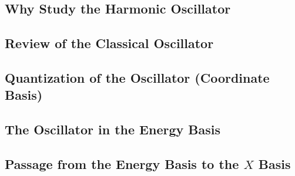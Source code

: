 \subsection{Why Study the Harmonic Oscillator}

\subsection{Review of the Classical Oscillator}

\subsection{Quantization of the Oscillator (Coordinate Basis)}

\subsection{The Oscillator in the Energy Basis}

\subsection{Passage from the Energy Basis to the $X$ Basis}

